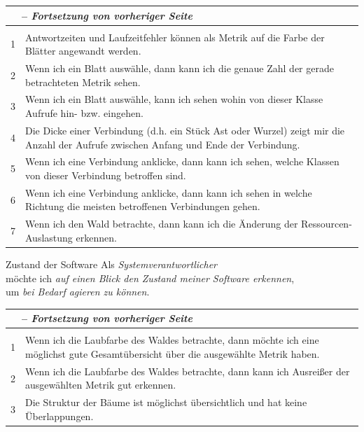 \newcommand{\tableheader}{
\endfirsthead
\multicolumn{2}{l}{\small \tablename\ \thetable\ -- \textit{Fortsetzung von vorheriger Seite}} \\
\hline
  \endhead
  \hline
  \endlastfoot
  \hline
\multicolumn{2}{r}{\textit{\small Fortsetzung auf nächster Seite...}} \\
\endfoot
\hline
}
\renewcommand{\arraystretch}{1.5}
\begin{tabularx}{\textwidth}{lX}
	\caption{Akzeptanzkriterien zu Userstory 1}\label{tab:static-metrics} \\
	\tableheader
    1 & Antwortzeiten und Laufzeitfehler können als Metrik auf die Farbe der Blätter angewandt werden.\\
    2 & Wenn ich ein Blatt auswähle, dann kann ich die genaue Zahl der gerade betrachteten Metrik sehen.\\
    3 & Wenn ich ein Blatt auswähle, kann ich sehen wohin von dieser Klasse Aufrufe hin- bzw. eingehen.\\
    4 & Die Dicke einer Verbindung (d.h. ein Stück Ast oder Wurzel) zeigt mir die Anzahl der Aufrufe zwischen Anfang und Ende der Verbindung.\\
    5 & Wenn ich eine Verbindung anklicke, dann kann ich sehen, welche Klassen von dieser Verbindung betroffen sind.\\
    6 & Wenn ich eine Verbindung anklicke, dann kann ich sehen in welche Richtung die meisten betroffenen Verbindungen gehen.\\
    7 & Wenn ich den Wald betrachte, dann kann ich die Änderung der Ressourcen-Auslastung erkennen.
\end{tabularx}

\begin{userstoryf}{Zustand der Software}
  Als \textit{Systemverantwortlicher}\\
  möchte ich \textit{auf einen Blick den Zustand meiner Software erkennen},\\
  um \textit{bei Bedarf agieren zu können}.
\end{userstoryf}

\begin{tabularx}{\textwidth}{lX}
	\caption{Akzeptanzkriterien zu Userstory 2}\label{tab:static-metrics} \\
	\tableheader
    1 & Wenn ich die Laubfarbe des Waldes betrachte, dann möchte ich eine möglichst gute Gesamtübersicht über die ausgewählte Metrik haben.\\
    2 & Wenn ich die Laubfarbe des Waldes betrachte, dann kann ich Ausreißer der ausgewählten Metrik gut erkennen.\\
    3 & Die Struktur der Bäume ist möglichst übersichtlich und hat keine Überlappungen.
\end{tabularx}

